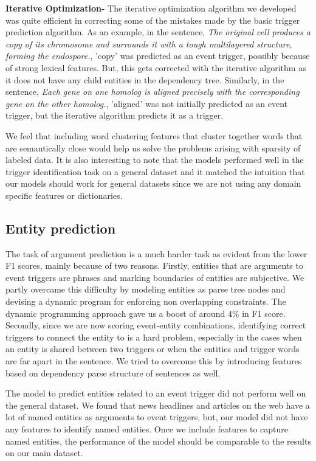 {\bf Iterative Optimization-} The iterative optimization algorithm we developed was quite efficient in correcting some of the mistakes made by the basic trigger prediction algorithm. As an example, in the sentence, {\em The original cell produces a copy of its chromosome and surrounds it with a tough multilayered structure, forming the endospore.}, 'copy' was predicted as an event trigger, possibly because of strong lexical features. But, this gets corrected with the iterative algorithm as it does not have any child entities in the dependency tree. Similarly, in the sentence, {\em Each gene on one homolog is aligned precisely with the corresponding gene on the other homolog.}, 'aligned' was not initially predicted as an event trigger, but the iterative algorithm predicts it as a trigger.

We feel that including word clustering features that cluster together words that are semantically close would help us solve the problems arising with sparsity of labeled data. It is also interesting to note that the models performed well in the trigger identification task on a general dataset and it matched the intuition that our models should work for general datasets since we are not using any domain specific features or dictionaries.

\subsection{Entity prediction}
The task of argument prediction is a much harder task as evident from the lower F1 scores, mainly because of two reasons. Firstly, entities that are arguments to event triggers are phrases and marking boundaries of entities are subjective. We partly overcame this difficulty by modeling entities as parse tree nodes and devising a dynamic program for enforcing non overlapping constraints. The dynamic programming approach gave us a boost of around 4\% in F1 score. Secondly, since we are now scoring event-entity combinations, identifying correct triggers to connect the entity to is a hard problem, especially in the cases when an entity is shared between two triggers or when the entities and trigger words are far apart in the sentence. We tried to overcome this by introducing features based on dependency parse structure of sentences as well.

The model to predict entities related to an event trigger did not perform well on the general dataset. We found that news headlines and articles on the web have a lot of named entities as arguments to event triggers, but, our model did not have any features to identify named entities. Once we include features to capture named entities, the performance of the model should be comparable to the results on our main dataset.


